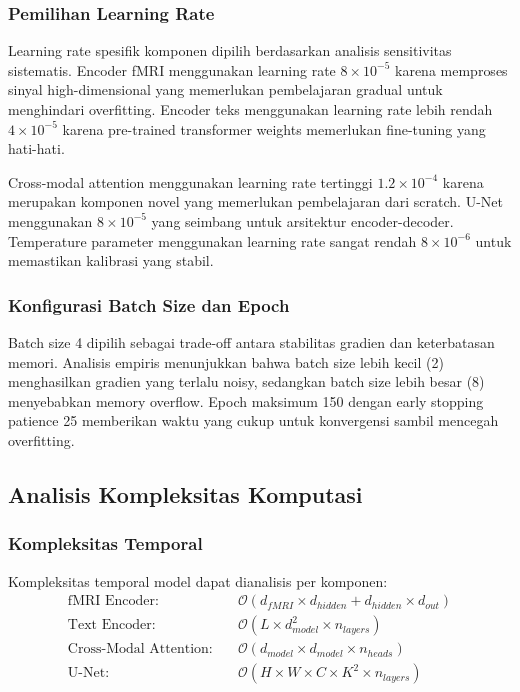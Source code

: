 \subsubsection{Pemilihan Learning Rate}
Learning rate spesifik komponen dipilih berdasarkan analisis sensitivitas sistematis. Encoder fMRI menggunakan learning rate $8 \times 10^{-5}$ karena memproses sinyal high-dimensional yang memerlukan pembelajaran gradual untuk menghindari overfitting. Encoder teks menggunakan learning rate lebih rendah $4 \times 10^{-5}$ karena pre-trained transformer weights memerlukan fine-tuning yang hati-hati.

Cross-modal attention menggunakan learning rate tertinggi $1.2 \times 10^{-4}$ karena merupakan komponen novel yang memerlukan pembelajaran dari scratch. U-Net menggunakan $8 \times 10^{-5}$ yang seimbang untuk arsitektur encoder-decoder. Temperature parameter menggunakan learning rate sangat rendah $8 \times 10^{-6}$ untuk memastikan kalibrasi yang stabil.

\subsubsection{Konfigurasi Batch Size dan Epoch}
Batch size 4 dipilih sebagai trade-off antara stabilitas gradien dan keterbatasan memori. Analisis empiris menunjukkan bahwa batch size lebih kecil (2) menghasilkan gradien yang terlalu noisy, sedangkan batch size lebih besar (8) menyebabkan memory overflow. Epoch maksimum 150 dengan early stopping patience 25 memberikan waktu yang cukup untuk konvergensi sambil mencegah overfitting.

\subsection{Analisis Kompleksitas Komputasi}

\subsubsection{Kompleksitas Temporal}
Kompleksitas temporal model dapat dianalisis per komponen:
\begin{align}
\text{fMRI Encoder:} \quad &\mathcal{O}(d_{fMRI} \times d_{hidden} + d_{hidden} \times d_{out}) \label{eq:complexity_fmri} \\
\text{Text Encoder:} \quad &\mathcal{O}(L \times d_{model}^2 \times n_{layers}) \label{eq:complexity_text} \\
\text{Cross-Modal Attention:} \quad &\mathcal{O}(d_{model} \times d_{model} \times n_{heads}) \label{eq:complexity_attention} \\
\text{U-Net:} \quad &\mathcal{O}(H \times W \times C \times K^2 \times n_{layers}) \label{eq:complexity_unet}
\end{align}

